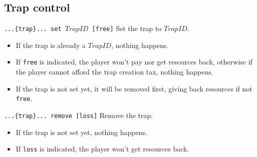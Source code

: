 \documentclass[10pt,a4paper]{scrartcl}
\newenvironment{apiCode}[1]
{ \begin{lrbox}{\mybox} \begin{minipage}{0.9\textwidth} {\color{Mahogany} \small\texttt{#1}} \vspace{8pt} \newline }
{ \end{minipage} \end{lrbox}\fbox{\usebox{\mybox}} \newline\vspace{4pt}\newline }
\begin{document}
\subsection{Trap control}
\begin{apiCode}{...\{trap\}... set $TrapID$ [free]}
Set the trap to $TrapID$.
\begin{itemize}
\itemsep 0em
\item If the trap is already a $TrapID$, nothing happens.
\item If \verb#free# is indicated, the player won't pay nor get resources back,\newline
	  otherwise if the player cannot afford the trap creation tax, nothing happens.
\item If the trap is not set yet, it will be removed first, giving back resources if not \verb#free#.
\end{itemize}
\end{apiCode}
\begin{apiCode}{...\{trap\}... remove [loss]}
Remove the trap.
\begin{itemize}
\itemsep 0em
\item If the trap is not set yet, nothing happens.
\item If \verb#loss# is indicated, the player won't get resources back.
\end{itemize}
\end{apiCode}
\end{document}
